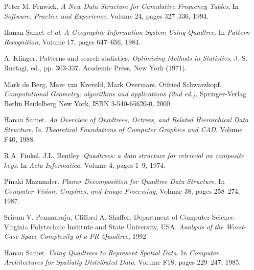 \documentclass[a4paper]{article}
\begin{document}
\begin{thebibliography}{1}
Peter M. Fenwick.
\emph{A New Data Structure for Cumulative Frequency Tables}. In \emph{Software: Practice and Experience}, Volume 24, pages 327--336, 1994.

Hanan Samet \textit{et al}.
\emph{A Geographic Information System Using Quadtree}. In \emph{Pattern Recognition}, Volume 17, pages 647--656, 1984.

A. Klinger.
Patterns and search statistics, \emph{Optimizing Methods in Statistics}, J. S. Rustagi, ed., pp. 303-337. Academic Press, New York (1971).

Mark de Berg, Marc van Kreveld, Mark Overmars, Otfried Schwarzkopf.
\emph{Computational Geometry: algorithms and applications (2nd ed.)}. Springer-Verlag Berlin Heidelberg New York, ISBN 3-540-65620-0, 2000.

Hanan Samet.
\emph{An Overview of Quadtrees, Octrees, and Related Hierarchical Data Structure}. In \emph{Theoretical Foundations of Computer Graphics and CAD}, Volume F40, 1988.

R.A. Finkel, J.L. Bentley.
\emph{Quadtrees: a data structure for retrieval on composite keys}. In \emph{Acta Informatica}, Volume 4, pages 1--9, 1974.

Pinaki Mazumder.
\emph{Planar Decomposition for Quadtree Data Structure}. In \emph{Computer Vision, Graphics, and Image Processing}, Volume 38, pages 258--274, 1987.

Sriram V. Pemmaraju, Clifford A. Shaffer. Department of Computer Science Virginia Polytechnic Institute and State University, USA.
\emph{Analysis of the Worst-Case Space Complexity of a PR Quadtree}, 1992

Hanan Samet.
\emph{Using Quadtrees to Represent Spatial Data}. In \emph{Computer Architectures for Spatially Distributed Data}, Volume F18, pages 229--247, 1985.
\end{thebibliography}
\end{document}
